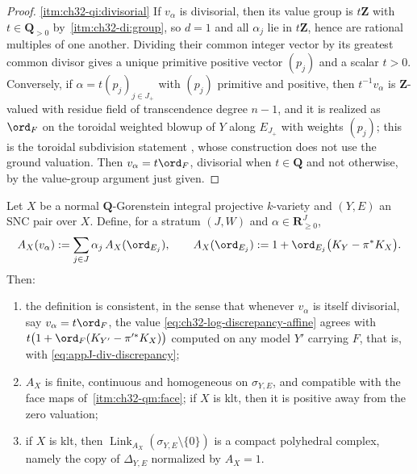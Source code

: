 \begin{proof}
\cref{itm:ch32-qi:divisorial}  If $v_\alpha$ is divisorial, then its value
group is $t\mathbf Z$ with $t\in\mathbf Q_{>0}$ by
\,\cref{itm:ch32-di:group}, so
$d=1$ and all $\alpha_j$ lie in $t\mathbf Z$, hence are rational
multiples of one another.  Dividing their common integer vector by its
greatest common divisor gives a unique primitive positive vector $(p_j)$
and a scalar $t>0$.  Conversely, if
$\alpha=t(p_j)_{j\in J_+}$ with $(p_j)$ primitive and positive, then
$t^{-1}v_\alpha$ is $\mathbf Z$-valued with residue field of
transcendence degree $n-1$, and it is realized as $\ord_F$ on the
toroidal weighted blowup of $Y$ along $E_{J_+}$ with weights $(p_j)$;
this is the toroidal subdivision statement
, whose construction does not use the ground
valuation.  Then $v_\alpha=t\ord_F$, divisorial when $t\in\mathbf Q$ and
not otherwise, by the value-group argument just given.
\end{proof}

\begin{proposition}
\label{prop:ch32-log-discrepancy-affine}
Let $X$ be a normal $\mathbf Q$-Gorenstein integral projective
$k$-variety and $(Y,E)$ an SNC pair over $X$.  Define, for a stratum
$(J,W)$ and $\alpha\in\mathbf R_{\geq0}^J$,
\begin{equation}
\label{eq:ch32-log-discrepancy-affine}
 A_X(v_\alpha):=\sum_{j\in J}\alpha_j\,A_X(\ord_{E_j}),
 \qquad
 A_X(\ord_{E_j}):=1+\ord_{E_j}\bigl(K_{Y}-\pi^*K_X\bigr).
\end{equation}
Then:
\begin{enumerate}
\item\label{itm:ch32-lda:consistent}
the definition is consistent, in the sense that whenever $v_\alpha$ is
itself divisorial, say $v_\alpha=t\ord_F$, the value
\eqref{eq:ch32-log-discrepancy-affine} agrees with
$t\bigl(1+\ord_F(K_{Y'}-\pi'^*K_X)\bigr)$ computed on any model $Y'$
carrying $F$, that is, with \eqref{eq:appJ-div-discrepancy};
\item\label{itm:ch32-lda:positive}
$A_X$ is finite, continuous and homogeneous on $\sigma_{Y,E}$, and
compatible with the face maps of
\,\cref{itm:ch32-qm:face}; if $X$ is klt,
then it is positive away from the zero valuation;
\item\label{itm:ch32-lda:link}
if $X$ is klt, then
$\operatorname{Link}_{A_X}(\sigma_{Y,E}\setminus\{0\})$ is a compact
polyhedral complex, namely the copy of $\Delta_{Y,E}$ normalized by
$A_X=1$.
\end{enumerate}
\end{proposition}

